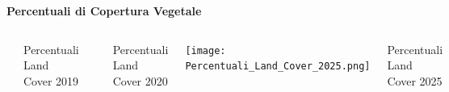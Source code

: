 \documentclass{beamer}
\begin{document}
\begin{frame}{\textbf{Percentuali di Copertura Vegetale}}
\begin{columns}
    \centering
    \includegraphics[width=\textwidth]{Percentuali_Land_Cover_2019.png}
    \caption{Percentuali Land Cover 2019}

    \centering
    \includegraphics[width=\textwidth]{Percentuali_Land_Cover_2020.png}
    \caption{Percentuali Land Cover 2020}

    \centering
    \texttt{[image: Percentuali\_Land\_Cover\_2025.png]}
    \caption{Percentuali Land Cover 2025}
\end{columns}
\end{frame}
\end{document}

